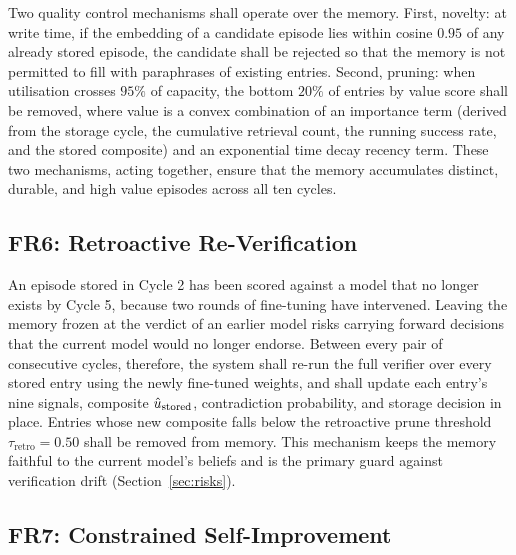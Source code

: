 Two quality control mechanisms shall operate over the memory. First, novelty: at write time, if the embedding of a candidate episode lies within cosine $0.95$ of any already stored episode, the candidate shall be rejected so that the memory is not permitted to fill with paraphrases of existing entries. Second, pruning: when utilisation crosses $95\%$ of capacity, the bottom $20\%$ of entries by value score shall be removed, where value is a convex combination of an importance term (derived from the storage cycle, the cumulative retrieval count, the running success rate, and the stored composite) and an exponential time decay recency term. These two mechanisms, acting together, ensure that the memory accumulates distinct, durable, and high value episodes across all ten cycles.

\subsection{FR6: Retroactive Re-Verification}
\label{sec:fr6}

An episode stored in Cycle 2 has been scored against a model that no longer exists by Cycle 5, because two rounds of fine-tuning have intervened. Leaving the memory frozen at the verdict of an earlier model risks carrying forward decisions that the current model would no longer endorse. Between every pair of consecutive cycles, therefore, the system shall re-run the full verifier over every stored entry using the newly fine-tuned weights, and shall update each entry's nine signals, composite $\hat{u}_{\text{stored}}$, contradiction probability, and storage decision in place. Entries whose new composite falls below the retroactive prune threshold $\tau_{\text{retro}} = 0.50$ shall be removed from memory. This mechanism keeps the memory faithful to the current model's beliefs and is the primary guard against verification drift (Section~\ref{sec:risks}).

\subsection{FR7: Constrained Self-Improvement}
\label{sec:fr7}

